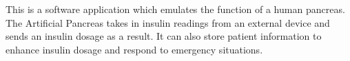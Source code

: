 This is a software application which emulates the function of a human pancreas. The Artificial Pancreas takes in insulin readings from an external device and sends an insulin dosage as a result. It can also store patient information to enhance insulin dosage and respond to emergency situations. 